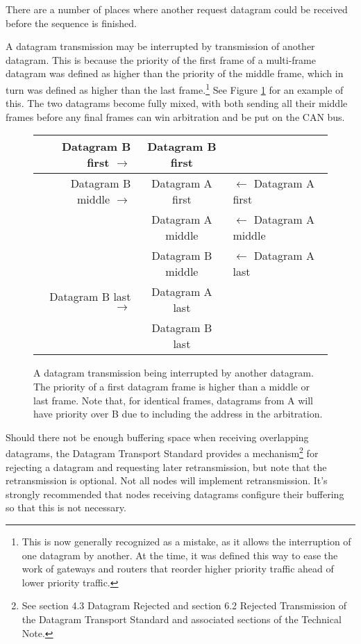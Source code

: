 \documentclass[11pt]{article}
\begin{document}
There are a number of places where another request 
datagram could be received before the sequence is finished.

A datagram transmission may be interrupted by transmission of
another datagram.  This is because the priority of the first frame of a 
multi-frame datagram was defined as higher than the priority of the middle
frame, which in turn was defined as higher than the last 
frame.\footnote{This is now generally recognized as a mistake, as it 
    allows the interruption of one datagram by another.  At the time, it 
    was defined this way to ease the work of gateways and routers that
    reorder higher priority traffic ahead of lower priority traffic.}
See 
Figure \ref{fig:datagram_interrupt}
for an example of this. The two datagrams become fully mixed, with both 
sending all their middle frames before any final frames can win
arbitration and be put on the CAN bus.

\begin{figure}[!htbp]
\begin{center}
\begin{tabular}{ r | c | l}
\hline
Datagram B first $\rightarrow$ & Datagram B first & \\ \hline
Datagram B middle $\rightarrow$ & Datagram A first & $\leftarrow$ Datagram A first \\ \hline
                            & Datagram A middle & $\leftarrow$ Datagram A middle \\ \hline
                            & Datagram B middle & $\leftarrow$ Datagram A last \\ \hline
Datagram B last $\rightarrow$ & Datagram A last & \\ \hline
                            & Datagram B last & \\ \hline
\end{tabular}
\end{center}
\caption{A datagram transmission being interrupted by another datagram.
The priority of a first datagram frame is higher than 
a middle or last frame.
Note that, for identical frames, datagrams from A will have priority over B
due to including the address in the arbitration.
}
\label{fig:datagram_interrupt}
\end{figure}

\cbstart
Should there not be enough buffering space when receiving 
overlapping datagrams,
the Datagram Transport Standard provides
a mechanism\footnote{
    See section 4.3 Datagram Rejected and 
    section 6.2 Rejected Transmission of
    the Datagram Transport Standard and associated
    sections of the Technical Note.
    
}
for rejecting a datagram and requesting later retransmission,
but note that the retransmission is optional.  Not
all nodes will implement retransmission.
It's strongly recommended that nodes receiving datagrams configure their buffering
so that this is not necessary.
\cbend
\end{document}
